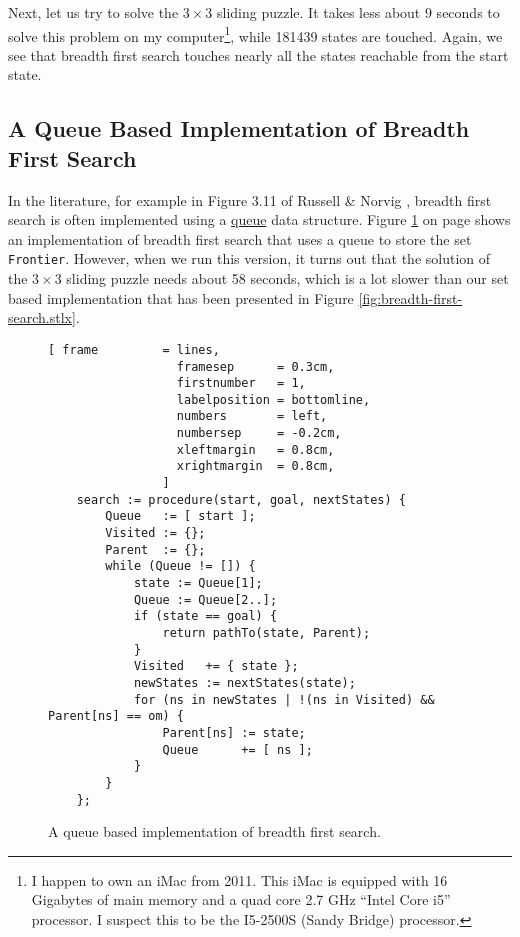 Next, let us try to solve the $3 \times 3$ sliding puzzle.  It takes less about 9 seconds to solve
this problem on my computer\footnote{
  I happen to own an iMac from 2011.  This iMac is equipped with 16 Gigabytes of main memory and a
  quad core 2.7 GHz ``Intel Core i5'' processor.  I suspect this to be the I5-2500S (Sandy Bridge) processor.
}, while 181439 states are touched.  Again, we see that breadth first search touches nearly all the
states reachable from the start state.

\subsection{A Queue Based Implementation of Breadth First Search}
In the literature, for example in Figure 3.11 of Russell \& Norvig \cite{russell:2009}, breadth
first search is often implemented using a
\href{https://en.wikipedia.org/wiki/Queue_(abstract_data_type)}{queue} data structure.  
Figure \ref{fig:breadth-first-search-queue.stlx} on page
\pageref{fig:breadth-first-search-queue.stlx} shows an implementation of breadth first search that
uses a queue to store the set \texttt{Frontier}.  However, when we run this version, it turns out
that the solution of the $3 \times 3$ sliding puzzle needs about 58 seconds, which is a lot
slower than our set based implementation that has been presented in Figure
\ref{fig:breadth-first-search.stlx}.

\begin{figure}[!ht]
\centering
\begin{Verbatim}[ frame         = lines, 
                  framesep      = 0.3cm, 
                  firstnumber   = 1,
                  labelposition = bottomline,
                  numbers       = left,
                  numbersep     = -0.2cm,
                  xleftmargin   = 0.8cm,
                  xrightmargin  = 0.8cm,
                ]
    search := procedure(start, goal, nextStates) {
        Queue   := [ start ];
        Visited := {}; 
        Parent  := {};
        while (Queue != []) {
            state := Queue[1];
            Queue := Queue[2..];
            if (state == goal) {
                return pathTo(state, Parent);
            }
            Visited   += { state };
            newStates := nextStates(state);
            for (ns in newStates | !(ns in Visited) && Parent[ns] == om) { 
                Parent[ns] := state;
                Queue      += [ ns ];
            }
        }
    };
\end{Verbatim}
\vspace*{-0.3cm}
\caption{A queue based implementation of breadth first search.}
\label{fig:breadth-first-search-queue.stlx}
\end{figure}

